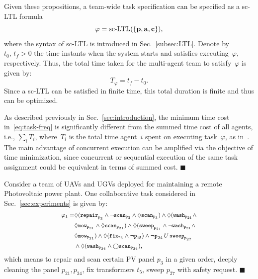 Given these propositions, a team-wide task specification can be specified as a sc-LTL formula
\begin{equation}\label{eq:task}
\varphi=\textup{sc-LTL}(\{\mathbf{p}, \mathbf{a}, \mathbf{c}\}),
\end{equation}
where the syntax of sc-LTL is introduced in Sec.~\ref{subsec:LTL}.
Denote by~$t_0,\, t_f>0$ the time instants when the system starts
and satisfies executing~$\varphi$, respectively.
Thus, the total time taken for the multi-agent team to satisfy~$\varphi$ is given by:
\begin{equation}\label{eq:task-freq}
T_\varphi = t_f-t_0.
\end{equation}
Since a sc-LTL can be satisfied in finite time, this total duration is finite and thus can be optimized. 


\begin{remark}\label{rm:cost}
  As described previously in Sec.~\ref{sec:introduction}, the minimum time cost in~\eqref{eq:task-freq} is significantly different from the summed time cost of all agents, i.e.,
$\sum_{i} T_i$, where~$T_i$ is the total time agent~$i$ spent on executing task~$\varphi$,
as in~\cite{kantaros2020stylus, schillinger2018simultaneous, guo2016task, luo2021temporal}.
The main advantage of concurrent execution can be amplified via
the objective of time minimization,
since concurrent or sequential execution of the same task assignment could
be equivalent in terms of summed cost.
\hfill $\blacksquare$
\end{remark}
\begin{example}\label{exp:task}
Consider a team of UAVs and UGVs deployed for maintaining a remote Photovoltaic power plant.
One collaborative task considered in Sec.~\ref{sec:experiments} is given by:
\begin{equation}\footnotesize
\label{example:task} 
\begin{aligned}
\varphi_1 = & \Diamond(\texttt{repair}_{\texttt{p}_{3}} \wedge \lnot \texttt{scan}_{\texttt{p}_3} \wedge\Diamond \texttt{scan}_{\texttt{p}_3})
\wedge \Diamond (\texttt{wash}_{\texttt{p}_{21}} \wedge \\
&\Diamond \texttt{mow}_{\texttt{p}_{21}} \wedge \Diamond \texttt{scan}_{\texttt{p}_{21}}) \wedge \Diamond ( \texttt{sweep}_{\texttt{p}_{21}} \wedge \lnot \texttt{wash}_{\texttt{p}_{21}} \wedge\\
& \Diamond \texttt{mow}_{\texttt{p}_{21}}) \wedge \Diamond(\texttt{fix}_{\texttt{t}_5} \wedge \lnot \texttt{p}_{\texttt{18}}) \wedge \lnot \texttt{p}_{24} \,U \, \texttt{sweep}_{\texttt{p}_{27}} \\
&\wedge \Diamond (\texttt{wash}_{\texttt{p}_{34}} \wedge \bigcirc \texttt{scan}_{\texttt{p}_{34}}),
\end{aligned}
\end{equation}
which means to repair and scan certain PV panel $p_3$
in a given order, deeply cleaning the panel $p_{21},p_{34}$, fix transformers
$t_5$, sweep $p_{27}$ with safety request. 
 \hfill $\blacksquare$
\end{example}
